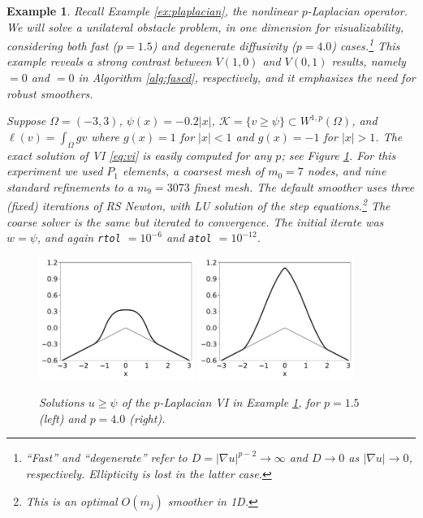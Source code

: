 \documentclass[letterpaper,final,12pt,reqno]{amsart}
\theoremstyle{cstyle}
\theoremstyle{cstyle*}
\theoremstyle{dstyle}
\newtheorem{example}[theorem]{Example}
\numberwithin{equation}{section}
\numberwithin{figure}{section}
\numberwithin{table}{section}
\numberwithin{theorem}{section}
\newcommand{\grad}{\nabla}
\begin{document}
\begin{example}  \label{ex:results:plap}
Recall Example \ref{ex:plaplacian}, the nonlinear $p$-Laplacian operator.  We will solve a unilateral obstacle problem, in one dimension for visualizability, considering both fast ($p=1.5$) and degenerate diffusivity ($p=4.0$) cases.\footnote{``Fast'' and ``degenerate'' refer to $D=|\grad u|^{p-2}\to \infty$ and $D\to 0$ as $|\grad u|\to 0$, respectively.  Ellipticity is lost in the latter case.}  This example reveals a strong contrast between $V(1,0)$ and $V(0,1)$ results, namely  $=0$ and  $=0$ in Algorithm \ref{alg:fascd}, respectively, and it emphasizes the need for robust smoothers.

Suppose $\Omega=(-3,3)$, $\psi(x) = -0.2|x|$, $\mathcal{K} = \{v \ge \psi\} \subset W^{1,p}(\Omega)$, and $\ell(v) = \int_\Omega g v$ where $g(x)=1$ for $|x|<1$ and $g(x)=-1$ for $|x|>1$.  The exact solution of VI \eqref{eq:vi} is easily computed for any $p$; see Figure \ref{fig:results:plap}.  For this experiment we used $P_1$ elements, a coarsest mesh of $m_0=7$ nodes, and nine standard refinements to a $m_9=3073$ finest mesh.  The default smoother uses three (fixed) iterations of RS Newton, with LU solution of the step equations.\footnote{This is an optimal $O(m_j)$ smoother in 1D.}  The coarse solver is the same but iterated to convergence.  The initial iterate was $w=\psi$, and again \texttt{rtol} $= 10^{-6}$ and \texttt{atol} $= 10^{-12}$.

\begin{figure}[ht]
\begin{center}
\includegraphics[width=0.45\textwidth]{fixfigs/plap1d1p5.pdf} \quad
\includegraphics[width=0.45\textwidth]{fixfigs/plap1d4p0.pdf}
\end{center}
\caption{Solutions $u\ge \psi$ of the $p$-Laplacian VI in Example \ref{ex:results:plap}, for $p=1.5$ (left) and $p=4.0$ (right).}
\label{fig:results:plap}
\end{figure}


\end{example}
\end{document}
